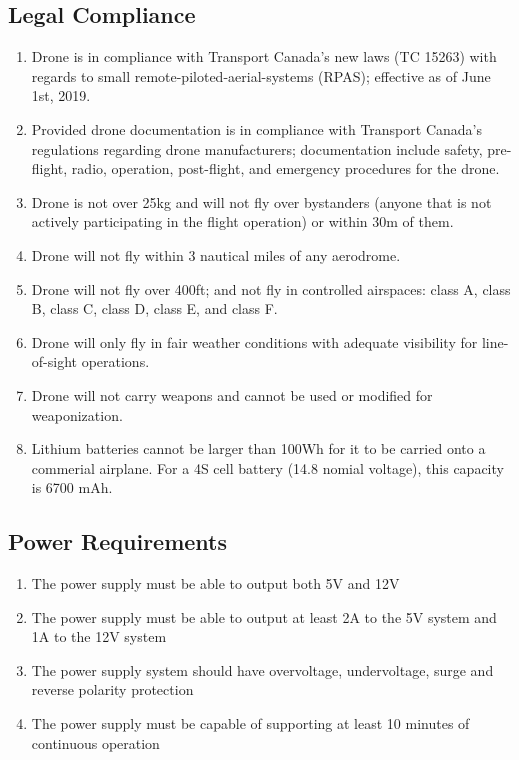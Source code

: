 \documentclass[10pt,letterpaper]{article}
\begin{document}
\subsection{Legal Compliance}
\begin{enumerate}[label=C.LC.\arabic*, wide=1cm, widest=3cm, leftmargin=*, font=\bfseries, noitemsep,topsep=0pt, parsep=4pt, partopsep=0pt]
    \item Drone is in compliance with Transport Canada's new laws (TC 15263) with regards to small remote-piloted-aerial-systems (RPAS); effective as of June 1st, 2019.
    \item Provided drone documentation is in compliance with Transport Canada's regulations regarding drone manufacturers; documentation include safety, pre-flight, radio, operation, post-flight, and emergency procedures for the drone.
    \item Drone is not over 25kg and will not fly over bystanders (anyone that is not actively participating in the flight operation) or within 30m of them.
    \item Drone will not fly within 3 nautical miles of any aerodrome.
    \item Drone will not fly over 400ft; and not fly in controlled airspaces: class A, class B, class C, class D, class E, and class F.
    \item Drone will only fly in fair weather conditions with adequate visibility for line-of-sight operations.
    \item Drone will not carry weapons and cannot be used or modified for weaponization.
    \item Lithium batteries cannot be larger than 100Wh for it to be carried onto a commerial airplane. For a 4S cell battery (14.8 nomial voltage), this capacity is 6700 mAh.
\end{enumerate}

\subsection{Power Requirements}
\begin{enumerate}[label=C.PR.\arabic*, wide=1cm, widest=3cm, leftmargin=*, font=\bfseries, noitemsep,topsep=0pt, parsep=4pt, partopsep=0pt]
    \item The power supply must be able to output both 5V and 12V
    \item The power supply must be able to output at least 2A to the 5V system and 1A to the 12V system
    \item The power supply system should have overvoltage, undervoltage, surge and reverse polarity protection
    \item The power supply must be capable of supporting at least 10 minutes of continuous operation
\end{enumerate}
\end{document}
